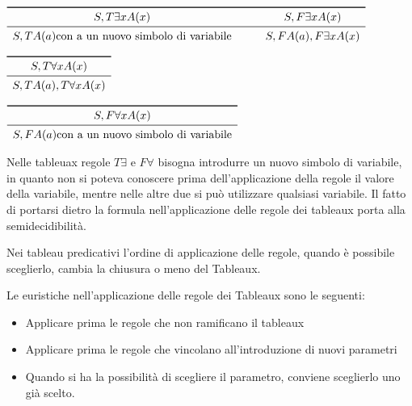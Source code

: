 $\begin{array}{cc}
\toprule S, T \exists x A(x) & \qquad S, F \exists x A(x) \\
\midrule S,T A(a) \text{con a un nuovo simbolo di variabile} & \qquad S,F A(a),F \exists x A(x) \\
\end{array}$

$\begin{array}{c}
\toprule S,T \forall x A(x) \\
\midrule S, T A(a), T \forall x A(x)\\
\end{array}$

\qquad $\begin{array}{c}
\toprule S,F \forall x A(x) \\
\midrule S,F A(a) \text{con a un nuovo simbolo di variabile} \\
\end{array}$

Nelle tableuax regole $T \exists$ e $F \forall$ bisogna introdurre un nuovo simbolo di
variabile, in quanto non si poteva conoscere prima dell'applicazione della regole
il valore della variabile, mentre nelle altre due si può utilizzare qualsiasi variabile.
Il fatto di portarsi dietro la formula nell'applicazione delle regole dei tableaux
porta alla semidecidibilità.

Nei tableau predicativi l'ordine di applicazione delle regole, quando è possibile
sceglierlo, cambia la chiusura o meno del Tableaux.

Le euristiche nell'applicazione delle regole dei Tableaux sono le seguenti:
\begin{itemize}
    \item Applicare prima le regole che non ramificano il tableaux
    \item Applicare prima le regole che vincolano all'introduzione di nuovi parametri
    \item Quando si ha la possibilità di scegliere il parametro, conviene sceglierlo uno già scelto.
\end{itemize}

